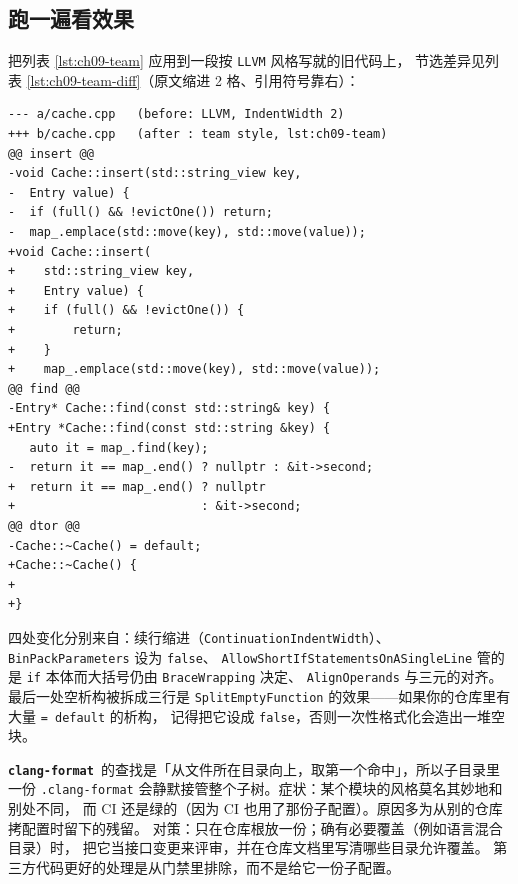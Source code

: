 \documentclass[12pt,a4paper,fontset=fandol]{ctexbook}
\newcommand{\Bk}{\discretionary{}{}{}}
\newcommand{\Lib}[1]{\textbf{\texttt{#1}}}
\newcommand{\Fmt}{\Lib{clang-format}}
\begin{document}
\subsection{跑一遍看效果}\label{sec:ch09-s6-effect}

把列表 \ref{lst:ch09-team} 应用到一段按 \texttt{LLVM} 风格写就的旧代码上，
节选差异见列表 \ref{lst:ch09-team-diff}（原文缩进 2 格、引用符号靠右）：

\begin{lstlisting}[style=diffstyle,caption={团队配置作用在既有代码上的差异节选},label={lst:ch09-team-diff}]
--- a/cache.cpp   (before: LLVM, IndentWidth 2)
+++ b/cache.cpp   (after : team style, lst:ch09-team)
@@ insert @@
-void Cache::insert(std::string_view key,
-  Entry value) {
-  if (full() && !evictOne()) return;
-  map_.emplace(std::move(key), std::move(value));
+void Cache::insert(
+    std::string_view key,
+    Entry value) {
+    if (full() && !evictOne()) {
+        return;
+    }
+    map_.emplace(std::move(key), std::move(value));
@@ find @@
-Entry* Cache::find(const std::string& key) {
+Entry *Cache::find(const std::string &key) {
   auto it = map_.find(key);
-  return it == map_.end() ? nullptr : &it->second;
+  return it == map_.end() ? nullptr
+                          : &it->second;
@@ dtor @@
-Cache::~Cache() = default;
+Cache::~Cache() {
+
+}
\end{lstlisting}

四处变化分别来自：续行缩进（\texttt{Continuation\hspace{0pt}IndentWidth}）、
\texttt{Bin{\Bk}Pack{\Bk}Parameters} 设为 \texttt{false}、
\texttt{Allow{\Bk}Short{\Bk}If{\Bk}Statements\hspace{0pt}OnASingleLine}
管的是 \texttt{if} 本体而大括号仍由 \texttt{Brace{\Bk}Wrapping} 决定、
\texttt{Align{\Bk}Operands} 与三元的对齐。最后一处空析构被拆成三行是
\texttt{Split{\Bk}Empty{\Bk}Function} 的效果——如果你的仓库里有大量 \texttt{= default} 的析构，
记得把它设成 \texttt{false}，否则一次性格式化会造出一堆空块。

\begin{bestpractice}[title={配置只放仓库根，子目录不放覆盖文件}]
  \Fmt\ 的查找是「从文件所在目录向上，取第一个命中」，所以子目录里一份
  \texttt{.clang-format} 会静默接管整个子树。症状：某个模块的风格莫名其妙地和别处不同，
  而 CI 还是绿的（因为 CI 也用了那份子配置）。原因多为从别的仓库拷配置时留下的残留。
  对策：只在仓库根放一份；确有必要覆盖（例如语言混合目录）时，
  把它当接口变更来评审，并在仓库文档里写清哪些目录允许覆盖。
  第三方代码更好的处理是从门禁里排除，而不是给它一份子配置。
\end{bestpractice}
\end{document}
